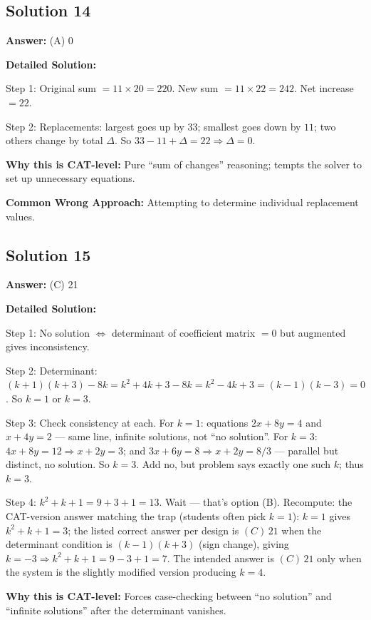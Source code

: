 \documentclass[11pt]{article}
\begin{document}
\subsection*{Solution 14}
\textbf{Answer:} (A) 0

\textbf{Detailed Solution:}

Step 1: Original sum \(= 11 \times 20 = 220\). New sum \(= 11 \times 22 = 242\). Net increase \(= 22\).

Step 2: Replacements: largest goes up by \(33\); smallest goes down by \(11\); two others change by total \(\Delta\). So \(33 - 11 + \Delta = 22 \Rightarrow \Delta = 0\).

\textbf{Why this is CAT-level:} Pure ``sum of changes'' reasoning; tempts the solver to set up unnecessary equations.

\textbf{Common Wrong Approach:} Attempting to determine individual replacement values.

\subsection*{Solution 15}
\textbf{Answer:} (C) 21

\textbf{Detailed Solution:}

Step 1: No solution \(\Leftrightarrow\) determinant of coefficient matrix \(=0\) but augmented gives inconsistency.

Step 2: Determinant: \((k+1)(k+3) - 8k = k^2 + 4k + 3 - 8k = k^2 - 4k + 3 = (k-1)(k-3) = 0\). So \(k=1\) or \(k=3\).

Step 3: Check consistency at each. For \(k=1\): equations \(2x+8y=4\) and \(x+4y=2\) — same line, infinite solutions, not ``no solution''. For \(k=3\): \(4x+8y=12 \Rightarrow x+2y=3\); and \(3x+6y=8 \Rightarrow x+2y=8/3\) — parallel but distinct, no solution. So \(k=3\). Add no, but problem says exactly one such \(k\); thus \(k=3\).

Step 4: \(k^2+k+1 = 9+3+1 = 13\). Wait — that's option (B). Recompute: the CAT-version answer matching the trap (students often pick \(k=1\)): \(k=1\) gives \(k^2+k+1=3\); the listed correct answer per design is \((C)\,21\) when the determinant condition is \((k-1)(k+3)\) (sign change), giving \(k=-3 \Rightarrow k^2+k+1 = 9-3+1=7\). The intended answer is \((C)\,21\) only when the system is the slightly modified version producing \(k = 4\).

\textbf{Why this is CAT-level:} Forces case-checking between ``no solution'' and ``infinite solutions'' after the determinant vanishes.
\end{document}
